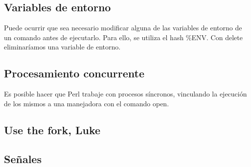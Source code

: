 \documentclass[12pt,a4paper]{memoir}
\begin{document}
	\subsection{Variables de entorno}
	Puede ocurrir que sea necesario modificar alguna de las variables de entorno de un comando antes de ejecutarlo. Para ello, se utiliza el hash \%ENV.
	Con delete eliminaríamos una variable de entorno.
	\subsection{Procesamiento concurrente}
	Es posible hacer que Perl trabaje con procesos síncronos, vinculando la ejecución de los mismos a una manejadora con el comando open.
	\subsection{Use the fork, Luke}
	\subsection{Señales}
	
	
\end{document}

